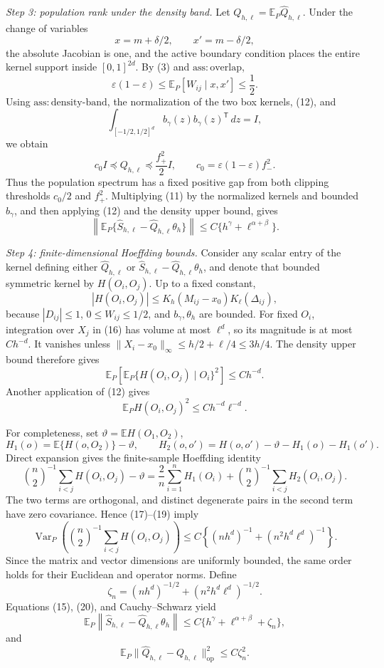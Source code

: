\emph{Step 3: population rank under the density band.}
Let \(Q_{h,\ell}=\mathbb E_P\widehat Q_{h,\ell}\).  Under the change of variables
\[
x=m+\delta/2,
\qquad x'=m-\delta/2,
\tag{12}
\]
the absolute Jacobian is one, and the active boundary condition places the entire kernel support inside \([0,1]^{2d}\).  By (3) and \(\mathrm{ass:overlap}\),
\[
\varepsilon(1-\varepsilon)
\leq\mathbb E_P[W_{ij}\mid x,x']\leq\frac12.
\tag{13}
\]
Using \(\mathrm{ass:density\mbox{-}band}\), the normalization of the two box kernels, (12), and
\[
\int_{[-1/2,1/2]^d}b_\gamma(z)b_\gamma(z)^{\mathsf T}\,dz=I,
\]
we obtain
\[
c_0I\preceq Q_{h,\ell}\preceq\frac{f_+^2}{2}I,
\qquad c_0=\varepsilon(1-\varepsilon)f_-^2.
\tag{14}
\]
Thus the population spectrum has a fixed positive gap from both clipping thresholds \(c_0/2\) and \(f_+^2\).  Multiplying (11) by the normalized kernels and bounded \(b_\gamma\), and then applying (12) and the density upper bound, gives
\[
\left\|
\mathbb E_P\{\widehat S_{h,\ell}-\widehat Q_{h,\ell}\theta_h\}
\right\|
\leq C\{h^\gamma+\ell^{\alpha+\beta}\}.
\tag{15}
\]

\emph{Step 4: finite-dimensional Hoeffding bounds.}
Consider any scalar entry of the kernel defining either \(\widehat Q_{h,\ell}\) or \(\widehat S_{h,\ell}-\widehat Q_{h,\ell}\theta_h\), and denote that bounded symmetric kernel by \(H(O_i,O_j)\).  Up to a fixed constant,
\[
|H(O_i,O_j)|
\leq K_h(M_{ij}-x_0)K_\ell(\Delta_{ij}),
\tag{16}
\]
because \(|D_{ij}|\leq1\), \(0\leq W_{ij}\leq1/2\), and \(b_\gamma,\theta_h\) are bounded.  For fixed \(O_i\), integration over \(X_j\) in (16) has volume at most \(\ell^d\), so its magnitude is at most \(Ch^{-d}\).  It vanishes unless \(\lVert X_i-x_0\rVert_\infty\leq h/2+\ell/4\leq3h/4\).  The density upper bound therefore gives
\[
\mathbb E_P\left[
\mathbb E_P\{H(O_i,O_j)\mid O_i\}^2
\right]\leq Ch^{-d}.
\tag{17}
\]
Another application of (12) gives
\[
\mathbb E_PH(O_i,O_j)^2\leq Ch^{-d}\ell^{-d}.
\tag{18}
\]

For completeness, set \(\vartheta=\mathbb EH(O_1,O_2)\),
\[
H_1(o)=\mathbb E\{H(o,O_2)\}-\vartheta,
\qquad
H_2(o,o')=H(o,o')-\vartheta-H_1(o)-H_1(o').
\]
Direct expansion gives the finite-sample Hoeffding identity
\[
\binom n2^{-1}\sum_{i<j}H(O_i,O_j)-\vartheta
=\frac2n\sum_{i=1}^nH_1(O_i)
+\binom n2^{-1}\sum_{i<j}H_2(O_i,O_j).
\tag{19}
\]
The two terms are orthogonal, and distinct degenerate pairs in the second term have zero covariance.  Hence (17)--(19) imply
\[
\operatorname{Var}_P\!\left(
\binom n2^{-1}\sum_{i<j}H(O_i,O_j)
\right)
\leq C\left\{(nh^d)^{-1}+(n^2h^d\ell^d)^{-1}\right\}.
\tag{20}
\]
Since the matrix and vector dimensions are uniformly bounded, the same order holds for their Euclidean and operator norms.  Define
\[
\zeta_n=(nh^d)^{-1/2}+(n^2h^d\ell^d)^{-1/2}.
\tag{21}
\]
Equations (15), (20), and Cauchy--Schwarz yield
\[
\mathbb E_P\left\|
\widehat S_{h,\ell}-\widehat Q_{h,\ell}\theta_h
\right\|
\leq C\{h^\gamma+\ell^{\alpha+\beta}+\zeta_n\},
\tag{22}
\]
and
\[
\mathbb E_P\lVert\widehat Q_{h,\ell}-Q_{h,\ell}\rVert_{\mathrm{op}}^2
\leq C\zeta_n^2.
\tag{23}
\]

